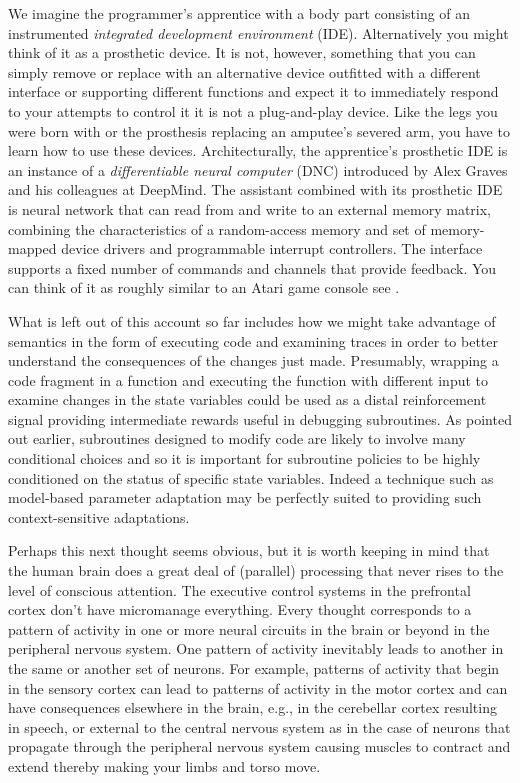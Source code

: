 We imagine the programmer's apprentice with a body part consisting of an instrumented {\it{integrated development environment}} (IDE). Alternatively you might think of it as a prosthetic device. It is not, however, something that you can simply remove or replace with an alternative device outfitted with a different interface or supporting different functions and expect it to immediately respond to your attempts to control it \emdash{} it is not a plug-and-play device. Like the legs you were born with or the prosthesis replacing an amputee's severed arm, you have to learn how to use these devices. Architecturally, the apprentice's prosthetic IDE is an instance of a {\it{differentiable neural computer}} (DNC) introduced by Alex Graves and his colleagues at DeepMind. The assistant combined with its prosthetic IDE is neural network that can read from and write to an external memory matrix, combining the characteristics of a random-access memory and set of memory-mapped device drivers and programmable interrupt controllers. The interface supports a fixed number of commands and channels that provide feedback. You can think of it as roughly similar to an Atari game console \emdash{} see {{}}.


What is left out of this account so far includes how we might take advantage of semantics in the form of executing code and examining traces in order to better understand the consequences of the changes just made. Presumably, wrapping a code fragment in a function and executing the function with different input to examine changes in the state variables could be used as a distal reinforcement signal providing intermediate rewards useful in debugging subroutines. As pointed out earlier, subroutines designed to modify code are likely to involve many conditional choices and so it is important for subroutine policies to be highly conditioned on the status of specific state variables. Indeed a technique such as model-based parameter adaptation may be perfectly suited to providing such context-sensitive adaptations.

Perhaps this next thought seems obvious, but it is worth keeping in mind that the human brain does a great deal of (parallel) processing that never rises to the level of conscious attention. The executive control systems in the prefrontal cortex don't have micromanage everything. Every thought corresponds to a pattern of activity in one or more neural circuits in the brain or beyond in the peripheral nervous system. One pattern of activity inevitably leads to another in the same or another set of neurons. For example, patterns of activity that begin in the sensory cortex can lead to patterns of activity in the motor cortex and can have consequences elsewhere in the brain, e.g., in the cerebellar cortex resulting in speech, or external to the central nervous system as in the case of neurons that propagate through the peripheral nervous system causing muscles to contract and extend thereby making your limbs and torso move. 

